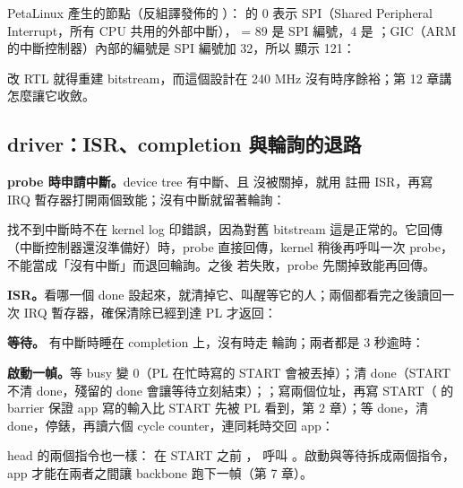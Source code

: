 
PetaLinux 產生的節點（反組譯發佈的 ）： 的 0 表示 SPI（Shared Peripheral Interrupt，所有 CPU 共用的外部中斷）， = 89 是 SPI 編號，4 是 ；GIC（ARM 的中斷控制器）內部的編號是 SPI 編號加 32，所以  顯示 121：


改 RTL 就得重建 bitstream，而這個設計在 240 MHz 沒有時序餘裕；第 12 章講怎麼讓它收斂。

\subsection{driver：ISR、completion 與輪詢的退路}

\textbf{probe 時申請中斷。}device tree 有中斷、且  沒被關掉，就用  註冊 ISR，再寫 IRQ 暫存器打開兩個致能；沒有中斷就留著輪詢：


 找不到中斷時不在 kernel log 印錯誤，因為對舊 bitstream 這是正常的。它回傳 （中斷控制器還沒準備好）時，probe 直接回傳，kernel 稍後再呼叫一次 probe，不能當成「沒有中斷」而退回輪詢。之後  若失敗，probe 先關掉致能再回傳。

\textbf{ISR。}看哪一個 done 設起來，就清掉它、叫醒等它的人；兩個都看完之後讀回一次 IRQ 暫存器，確保清除已經到達 PL 才返回：


\textbf{等待。} 有中斷時睡在 completion 上，沒有時走  輪詢；兩者都是 3 秒逾時：


\textbf{啟動一幀。}等 busy 變 0（PL 在忙時寫的 START 會被丟掉）；清 done（START 不清 done，殘留的 done 會讓等待立刻結束）；；寫兩個位址，再寫 START（ 的 barrier 保證 app 寫的輸入比 START 先被 PL 看到，第 2 章）；等 done，清 done，停錶，再讀六個 cycle counter，連同耗時交回 app：


head 的兩個指令也一樣： 在 START 之前 ， 呼叫 。啟動與等待拆成兩個指令，app 才能在兩者之間讓 backbone 跑下一幀（第 7 章）。

